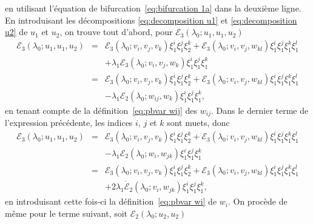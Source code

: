 \documentclass{article}
\begin{document}
en utilisant l'équation de bifurcation~\eqref{eq:bifurcation 1a} dans la
deuxième ligne. En introduisant les décompositions
\eqref{eq:decomposition u1} et \eqref{eq:decomposition u2} de $u_1$ et $u_2$,
on trouve tout d'abord, pour $\mathcal{E}_3 (λ_0 ; u_1, u_1, u_2)$
\begin{eqnarray*}
  \mathcal{E}_3 (λ_0 ; u_1, u_1, u_2) & = & \mathcal{E}_3 (λ_0 ;
  v_i, v_j, v_k) \xi_1^i \xi_1^j \xi_2^k +\mathcal{E}_3 (λ_0 ; v_i, v_j,
  w_{k  l}) \xi_1^i \xi_1^j \xi_1^k \xi_1^l\\
  &  &  + λ_1 \mathcal{E}_3 (λ_0 ; v_i, v_j, w_k)
  \xi_1^i \xi_1^j \xi_1^k\\
  & = & \mathcal{E}_3 (λ_0 ; v_i, v_j, v_k) \xi_1^i \xi_1^j \xi_2^k
  +\mathcal{E}_3 (λ_0 ; v_i, v_j, w_{k  l}) \xi_1^i \xi_1^j
  \xi_1^k \xi_1^l\\
  &  &  - λ_1 \mathcal{E}_2 (λ_0 ; w_{i  j},
  w_k) \xi_1^i \xi_1^j \xi_1^k,
\end{eqnarray*}
en tenant compte de la définition~\eqref{eq:pbvar wij} des $w_{i
j}$. Dans le dernier terme de l'expression précédente, les indices
$i$, $j$ et $k$ sont muets, donc
\begin{eqnarray*}
  \mathcal{E}_3 (λ_0 ; u_1, u_1, u_2) & = & \mathcal{E}_3 (λ_0 ;
  v_i, v_j, v_k) \xi_1^i \xi_1^j \xi_2^k +\mathcal{E}_3 (λ_0 ; v_i, v_j,
  w_{k  l}) \xi_1^i \xi_1^j \xi_1^k \xi_1^l\\
  &  &  - λ_1 \mathcal{E}_2 (λ_0 ; w_{i }, w_{j
   k}) \xi_1^i \xi_1^j \xi_1^k\\
  & = & \mathcal{E}_3 (λ_0 ; v_i, v_j, v_k) \xi_1^i \xi_1^j \xi_2^k
  +\mathcal{E}_3 (λ_0 ; v_i, v_j, w_{k  l}) \xi_1^i \xi_1^j
  \xi_1^k \xi_1^l\\
  &  &  + 2 λ_1  \dot{\mathcal{E}}_2 (λ_0 ; v_{i
  }, w_{j  k}) \xi_1^i \xi_1^j \xi_1^k,
\end{eqnarray*}
en introduisant cette fois-ci la définition~\eqref{eq:pbvar wi} de $w_i .$
On procède de même pour le terme suivant, soit $\mathcal{E}_2
(λ_0 ; u_2, u_2)$
\end{document}
